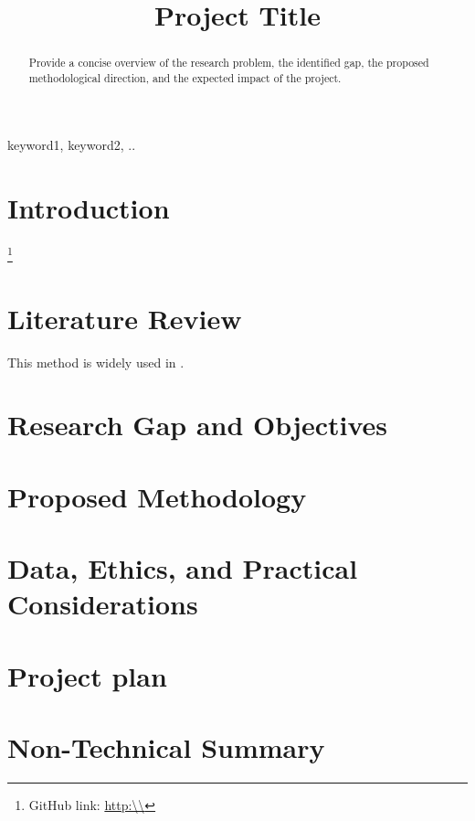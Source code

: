\documentclass[conference]{IEEEtran}
\begin{document}
\title{Project Title}

\author{
}

\maketitle

\begin{abstract}
Provide a concise overview of the research problem, the identified gap, the proposed methodological direction, and the expected impact of the project.
\end{abstract}

\begin{IEEEkeywords}
keyword1, keyword2, ..
\end{IEEEkeywords}

\section{Introduction}

\footnote {GitHub link: \url{http:\\}}


\section{Literature Review}
This method is widely used in  \cite{key2024example}.
\section{Research Gap and Objectives }
\section{Proposed Methodology}
\section{Data, Ethics, and Practical Considerations}
\section{Project plan}
\section{Non-Technical Summary}



\end{document}
